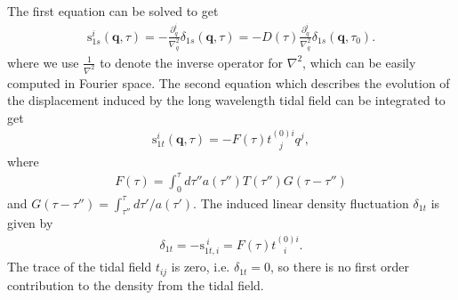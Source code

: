 \documentclass[aps,prd,twocolumn,showpacs,superscriptaddress,groupedaddress,nofootinbib]{revtex4}  %
\newcommand{\mr}{\mathrm}
\begin{document}
The first equation can be solved to get 
\begin{eqnarray}
\mr{s}_{1s}^i(\bm{q},\tau)
=-\frac{\partial^i_q}{\nabla^2_q}\delta_{1s}(\bm{q},\tau)
=-D(\tau)\frac{\partial^i_q}{\nabla^2_q}\delta_{1s}(\bm{q},\tau_0).
\end{eqnarray}
where we use $\frac{1}{\nabla^2}$ to denote the inverse operator for $\nabla^2$, which 
can be easily computed in Fourier space. 
The second equation which describes the evolution of the displacement induced 
by the long wavelength tidal field can be integrated to get 
\begin{eqnarray}
\mr{s}_{1t}^i(\bm{q},\tau)=-F(\tau)t^{(0)i}_{\ \ \ \ j}q^j,
\end{eqnarray}
where 
\begin{eqnarray}
F(\tau)=\int_0^\tau{d\tau{''}}{a(\tau{''})}T(\tau'')G(\tau-\tau'')
\end{eqnarray}
and $G(\tau-\tau'')=\int^\tau_{\tau''}d\tau'/a(\tau')$.
The induced linear density fluctuation $\delta_{1t}$ is given by
\begin{eqnarray}
\delta_{1t} = -\mr{s}^{\ i}_{1t,i} = F(\tau)t^{(0)i}_{\ \ \ \ i}.
\end{eqnarray}
The trace of the tidal field $t_{ij}$ is zero, i.e. $\delta_{1t}=0$, 
so there is no first order contribution to the density from the tidal field.
\end{document}
